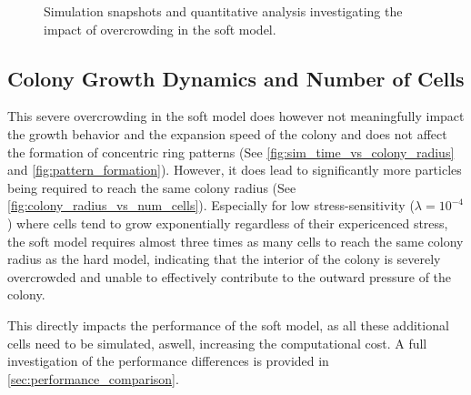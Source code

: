\documentclass[conference]{IEEEtran}
\begin{document}
\begin{figure}[H]
    \caption{Simulation snapshots and quantitative analysis investigating the impact of overcrowding in the soft model.}
    \label{fig:combined_packing_analysis}
\end{figure}

\subsection{Colony Growth Dynamics and Number of Cells}
\label{sec:colony_growth_dynamics}

This severe overcrowding in the soft model does however not meaningfully impact the growth behavior and the expansion speed of the colony and does not affect the formation of concentric ring patterns (See \autoref{fig:sim_time_vs_colony_radius} and \autoref{fig:pattern_formation}). However, it does lead to significantly more particles being required to reach the same colony radius (See \autoref{fig:colony_radius_vs_num_cells}).  Especially for low stress-sensitivity ($\lambda = 10^{-4}$) where cells tend to grow exponentially regardless of their expericenced stress, the soft model requires almost three times as many cells to reach the same colony radius as the hard model, indicating that the interior of the colony is severely overcrowded and unable to effectively contribute to the outward pressure of the colony.

This directly impacts the performance of the soft model, as all these additional cells need to be simulated, aswell, increasing the computational cost. A full investigation of the performance differences is provided in \autoref{sec:performance_comparison}.
\end{document}
